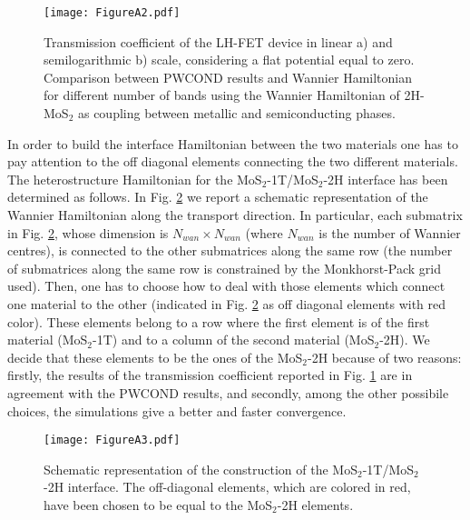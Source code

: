 \documentclass[aps,reprint,superscriptaddress,secnumarabic,amssymb,showpacs]{revtex4-1}
\begin{document}
\begin{figure}[h!!!]
\texttt{[image: FigureA2.pdf]}
\caption{Transmission coefficient of the LH-FET device in linear a) and semilogarithmic b) scale, considering a flat potential equal to zero. Comparison between PWCOND results and Wannier Hamiltonian for different number of bands using the Wannier Hamiltonian of 2H-MoS$_2$ as coupling between metallic and semiconducting phases.}
\label{fig:Fig2S}
\end{figure}

In order to build the interface Hamiltonian between the two materials one has to pay attention to the off diagonal elements connecting the two different materials. The heterostructure Hamiltonian for the MoS$_2$-1T/MoS$_2$-2H interface has been determined as follows. In Fig. \ref{fig:Fig3S} we report a schematic representation of the Wannier Hamiltonian along the transport direction. In particular, each submatrix in Fig. \ref{fig:Fig3S}, whose dimension is $N_{wan} \times N_{wan}$ (where $N_{wan}$ is the number of Wannier centres), is connected to the other submatrices along the same row (the number of submatrices along the same row is constrained by the Monkhorst-Pack grid used). Then, one has to choose how to deal with those elements which connect one material to the other (indicated in Fig. \ref{fig:Fig3S} as off diagonal elements with red color). These elements belong to a row where the first element is of the first material (MoS$_2$-1T) and to a column of the second material (MoS$_2$-2H). We decide that these elements to be the ones of the MoS$_2$-2H because of two reasons: firstly, the results of the transmission coefficient reported in Fig. \ref{fig:Fig2S} are in agreement with the PWCOND results, and secondly, among the other possibile choices, the simulations give a better and faster convergence.

\begin{figure}[h!!!]
\texttt{[image: FigureA3.pdf]}
\caption{Schematic representation of the construction of the MoS$_2$-1T/MoS$_2$-2H interface. The off-diagonal elements, which are colored in red, have been chosen to be equal to the MoS$_2$-2H elements.}
\label{fig:Fig3S}
\end{figure}
\end{document}
